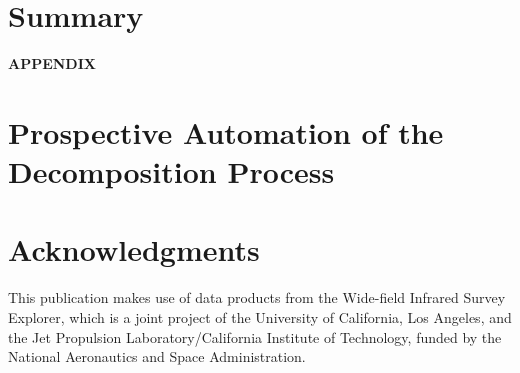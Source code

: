 \documentclass[numberedappendix,apj,twocolumn]{emulateapj}
\begin{document}
\section{Summary}


\acknowledgements



%


%

\newpage
\centerline{ {\bf APPENDIX}}
\appendix
\section{Prospective Automation of the Decomposition Process}

\section{Acknowledgments}
This publication makes use of data products from the Wide-field Infrared Survey Explorer, which is a joint project of the University of California, Los Angeles, and the Jet Propulsion Laboratory/California Institute of Technology, funded by the National Aeronautics and Space Administration.
\end{document}
